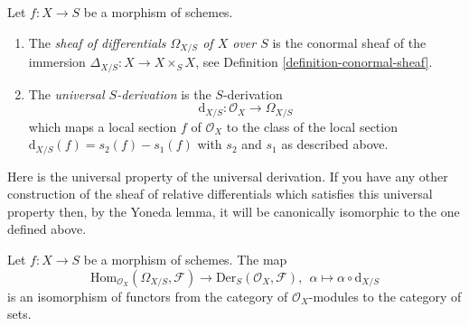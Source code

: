 \begin{definition}
\label{definition-sheaf-differentials}
Let $f : X \to S$ be a morphism of schemes.
\begin{enumerate}
\item The {\it sheaf of differentials $\Omega_{X/S}$ of $X$ over $S$} is
the conormal sheaf of the immersion $\Delta_{X/S} : X \to X \times_S X$,
see Definition \ref{definition-conormal-sheaf}.
\item The {\it universal $S$-derivation} is the $S$-derivation
$$
\text{d}_{X/S} : \mathcal{O}_X \longrightarrow \Omega_{X/S}
$$
which maps a local section $f$ of $\mathcal{O}_X$ to the class of
the local section $\text{d}_{X/S}(f) = s_2(f) - s_1(f)$ with
$s_2$ and $s_1$ as described above.
\end{enumerate}
\end{definition}

\noindent
Here is the universal property of the universal derivation.
If you have any other construction of the sheaf of relative differentials
which satisfies this universal property then, by the Yoneda lemma,
it will be canonically isomorphic to the one defined above.

\begin{lemma}
\label{lemma-universal-derivation-universal}
Let $f : X \to S$ be a morphism of schemes.
The map
$$
\text{Hom}_{\mathcal{O}_X}(\Omega_{X/S}, \mathcal{F})
\longrightarrow
\text{Der}_S(\mathcal{O}_X, \mathcal{F}), \ \ 
\alpha
\longmapsto
\alpha \circ \text{d}_{X/S}
$$
is an isomorphism of functors
from the category of $\mathcal{O}_X$-modules
to the category of sets.
\end{lemma}

